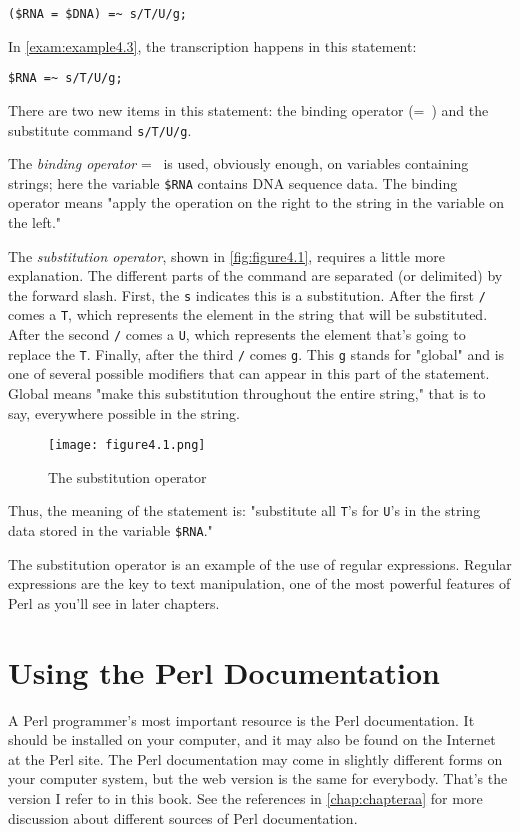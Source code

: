 \begin{lstlisting}
($RNA = $DNA) =~ s/T/U/g;
\end{lstlisting}

In \autoref{exam:example4.3}, the transcription happens in this statement:

\begin{lstlisting}
$RNA =~ s/T/U/g;
\end{lstlisting}

There are two new items in this statement: the binding operator (=~) and the substitute command \verb|s/T/U/g|.

The \textit{binding operator} =~ is used, obviously enough, on variables containing strings; here the variable \verb|$RNA| contains DNA sequence data. The binding operator means "apply the operation on the right to the string in the variable on the left."

The \textit{substitution operator}, shown in \autoref{fig:figure4.1}, requires a little more explanation. The different parts of the command are separated (or delimited) by the forward slash. First, the \verb|s| indicates this is a substitution. After the first \verb|/| comes a \verb|T|, which represents the element in the string that will be substituted. After the second \verb|/| comes a \verb|U|, which represents the element that's going to replace the \verb|T|. Finally, after the third \verb|/| comes \verb|g|. This \verb|g| stands for "global" and is one of several possible modifiers that can appear in this part of the statement. Global means "make this substitution throughout the entire string," that is to say, everywhere possible in the string. 

\begin{figure}
  \centering
  \texttt{[image: figure4.1.png]}
  \caption{The substitution operator}
  \label{fig:figure4.1}
\end{figure}

Thus, the meaning of the statement is: "substitute all \verb|T|'s for \verb|U|'s in the string data stored in the variable \verb|$RNA|."

The substitution operator is an example of the use of regular expressions. Regular expressions are the key to text manipulation, one of the most powerful features of Perl as you'll see in later chapters. 

\section{Using the Perl Documentation}
A Perl programmer's most important resource is the Perl documentation. It should be installed on your computer, and it may also be found on the Internet at the Perl site. The Perl documentation may come in slightly different forms on your computer system, but the web version is the same for everybody. That's the version I refer to in this book. See the references in \autoref{chap:chapteraa} for more discussion about different sources of Perl documentation.


